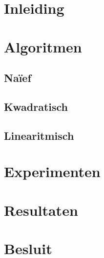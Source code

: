 \documentclass[12pt,a4paper]{article}
\begin{document}

\tableofcontents
\section{Inleiding}


\section{Algoritmen}

\subsection{Na\"ief}
\label{sec:naief}

\subsection{Kwadratisch}
\label{sec:kwadratisch}

\subsection{Linearitmisch}
\label{sec:linearitmisch}


\section{Experimenten}



\section{Resultaten}

\section{Besluit}

\listoftodos
\end{document}
